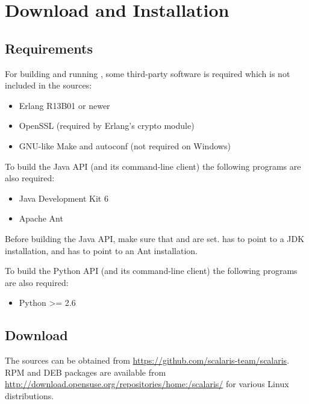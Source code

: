 \chapter{Download and Installation}
\label{chapter.downloadinstall}

\section{Requirements}
\label{sec.requirements}

For building and running \scalaris{}, some third-party software is
required which is not included in the \scalaris{} sources:

\begin{itemize}
\setlength{\itemsep}{0pt}
\setlength{\parskip}{0pt}
\item Erlang R13B01 or newer
\item OpenSSL (required by Erlang's crypto module)
\item GNU-like Make and autoconf (not required on Windows)
\end{itemize}

To build the Java API (and its command-line client) the following
programs are also required:

\begin{itemize}
\setlength{\itemsep}{0pt}
\setlength{\parskip}{0pt}
\item Java Development Kit 6
\item Apache Ant
\end{itemize}

Before building the Java API, make sure that  and
 are set.  has to point to a JDK
installation, and  has to point to an Ant installation.

To build the Python API (and its command-line client) the following
programs are also required:

\begin{itemize}
\setlength{\itemsep}{0pt}
\setlength{\parskip}{0pt}
\item Python >= 2.6
\end{itemize}

\section{Download}

The sources can be obtained from
\url{https://github.com/scalaris-team/scalaris}. RPM and DEB packages are available
from \url{http://download.opensuse.org/repositories/home:/scalaris/} for
various Linux distributions.

